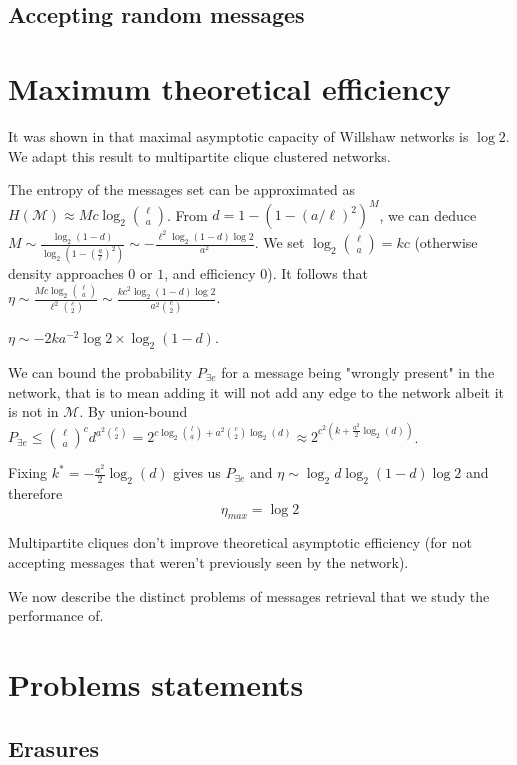 \documentclass[english,10pt,twocolumn]{IEEEtran}
\renewcommand{\le}{\leqslant}
\theoremstyle{definition}
\begin{document}
	\subsection{Accepting random messages}
		
	\section{Maximum theoretical efficiency}
		It was shown in \cite{Palm1980} that maximal asymptotic capacity of Willshaw networks is $\log 2$. We adapt this result to multipartite clique clustered networks.
		
		The entropy of the messages set can be approximated as $H(\mathcal{M}) \approx M c \log_2 {\ell \choose a}$. From $d = 1 - \left (1- \left(a/\ell\right)^2 \right)^M$, we can deduce $M \sim \frac{\log_2(1-d)}{\log_2(1-(\frac{a}{\ell})^2)} \sim - \frac{\ell^2 \log_2(1-d) \log 2}{a^2}$.
		We set $\log_2 {\ell \choose a} = k c$ (otherwise density approaches $0$ or $1$, and efficiency $0$). It follows that $\eta \sim \frac{M c \log_2 {\ell \choose a}}{\ell^2 {c \choose 2}} \sim \frac{k c^2 \log_2(1-d)\log 2}{a^2 {c \choose 2}}$. 
		
		$\eta \sim - 2 k  a^{-2}\log 2 \times \log_2 (1-d)$.
		
		We can bound the probability $P_{\exists e}$ for a message being "wrongly present" in the network, that is to mean adding it will not add any edge to the network albeit it is not in $\mathcal{M}$. By union-bound $P_{\exists e} \le {\ell \choose a}^c d^{a^2 {c \choose 2}} = 2^{c \log_ 2 {l \choose a} + a^2 {c \choose 2 }\log_2(d)} \approx 2^{c^2(k + \frac{a^2}{2} \log_2 (d))}$.
		
		Fixing $k^* = -\frac{a^2}{2} \log_2 (d)$ gives us $P_{\exists e}$ and $\eta \sim \log_2 d \log_2 (1-d) \log 2$ and therefore \[\eta_{max} = \log 2\]
	
		Multipartite cliques don't improve theoretical asymptotic efficiency (for not accepting messages that weren't previously seen by the network).


	We now describe the distinct problems of messages retrieval that we study the performance of.	
	
	\section{Problems statements}		
	
	\subsection{Erasures}
	
\end{document}
